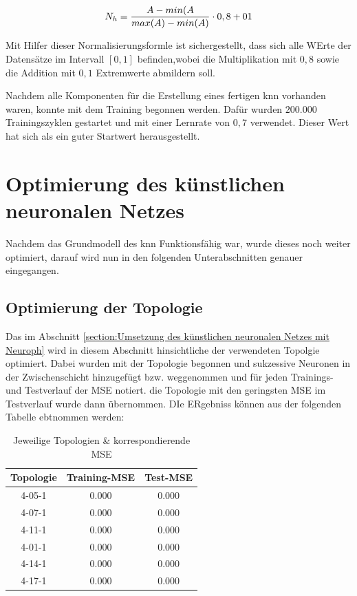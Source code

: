 \begin{equation}\formelentry{Normalisierungsformel}
  N_h = \frac{A-min(A}{max(A)-min(A)}\cdot0,8+01
\end{equation}

Mit Hilfer dieser Normalisierungsformle ist sichergestellt, dass sich alle WErte der Datensätze im Intervall $[0,1]$ befinden,wobei die Multiplikation mit $0,8$ sowie die Addition mit $0,1$ Extremwerte abmildern soll.

Nachdem alle Komponenten für die Erstellung eines fertigen \acs{knn} vorhanden waren, konnte mit dem Training begonnen werden. Dafür wurden $200.000$ Trainingszyklen gestartet und mit einer Lernrate von $0,7$ verwendet. Dieser Wert hat sich als ein guter Startwert herausgestellt.


\section{Optimierung des künstlichen neuronalen Netzes}

Nachdem das Grundmodell des \acs{knn} Funktionsfähig war, wurde dieses noch weiter optimiert, darauf wird nun in den folgenden Unterabschnitten genauer eingegangen. 

\label{section:Optimierung des künstlischen neuronalen Netzes}
\subsection{Optimierung der Topologie}
Das im Abschnitt \ref{section:Umsetzung des künstlichen neuronalen Netzes mit Neuroph} wird in diesem Abschnitt hinsichtliche der verwendeten Topolgie optimiert. Dabei wurden mit der Topologie begonnen und sukzessive Neuronen in der Zwischenschicht hinzugefügt bzw. weggenommen und für jeden Trainings- und Testverlauf der MSE notiert. die Topologie mit den geringsten MSE im Testverlauf wurde dann übernommen. DIe ERgebniss können aus der folgenden Tabelle ebtnommen werden:


\begin{table}[H]
  \centering
  \begin{tabular}{|c|c|c|}
  \hline 
  \rule[0ex]{0pt}{2.5ex} Topologie & Training-MSE & Test-MSE \\ 
  \hline 
  \rule[0ex]{0pt}{2.5ex} 4-05-1 & 0.000 & 0.000 \\ 
  \hline 
  \rule[0ex]{0pt}{2.5ex} 4-07-1 & 0.000 & 0.000 \\ 
  \hline 
  \rule[0ex]{0pt}{2.5ex} 4-11-1 & 0.000 & 0.000 \\ 
  \hline 
   \rule[0ex]{0pt}{2.5ex} 4-01-1 & 0.000 & 0.000 \\ 
  \hline 
  \rule[0ex]{0pt}{2.5ex} 4-14-1 & 0.000 & 0.000 \\ 
  \hline 
  \rule[0ex]{0pt}{2.5ex} 4-17-1 & 0.000 & 0.000 \\ 
  \hline 
  \end{tabular} 
  \caption{Jeweilige Topologien \& korrespondierende MSE}
  \label{tab:TOPMSE}
\end{table}


